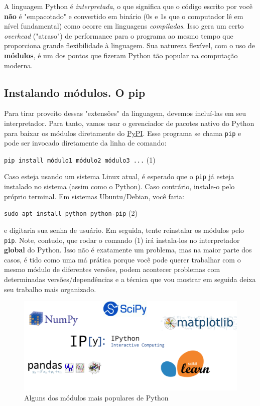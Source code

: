 \documentclass{article}
\begin{document}
	A linguagem Python é \textit{interpretada}, o que significa que o código escrito por você \textbf{não} é "empacotado" e
	convertido em binário (0s e 1s que o computador lê em nível fundamental) como ocorre em linguagens \textit{compiladas}. 
	Isso gera um certo \textit{overhead} ("atraso") de performance para o programa ao mesmo tempo que proporciona grande 
	flexibilidade à linguagem. Sua natureza flexível, com o uso de \textbf{módulos}, é um dos pontos que fizeram Python 
	tão popular na computação moderna. 

	\subsection{Instalando módulos. O pip}

	Para tirar proveito dessas "extensões" da linguagem, devemos incluí-las em seu interpretador. Para tanto, vamos usar
	o gerenciador de pacotes nativo do Python para baixar os módulos diretamente do \href{https://pypi.org/}{PyPI}.
	Esse programa se chama \texttt{pip} e pode ser invocado diretamente da linha de comando: 

	\vspace{1ex}
	\texttt{pip install módulo1 módulo2 módulo3 ...} (1)
	\vspace{1ex} 

	Caso esteja usando um sistema Linux atual, é esperado que o \texttt{pip} já esteja instalado no sistema (assim como o Python). 
	Caso contrário, instale-o pelo próprio terminal. Em sistemas Ubuntu/Debian, você faria: 

	\vspace{1ex} 
	\texttt{sudo apt install python python-pip} (2)
	\vspace{1ex} 

	e digitaria sua senha de usuário. Em seguida, tente reinstalar os módulos pelo \texttt{pip}. Note, contudo, que rodar o comando 
	(1) irá instala-los no interpretador \textbf{global} do Python. Isso não é exatamente um problema, mas na maior 
	parte dos casos, é tido como uma má prática porque você pode querer trabalhar com o mesmo módulo de diferentes versões,
	podem acontecer problemas com determinadas versões/dependências e a técnica que vou mostrar em seguida deixa seu trabalho
	mais organizado. 

	\begin{figure}[ht!]
  		\centering
		\includegraphics[scale=0.2]{figs/modules.png} 
  		\caption*{Alguns dos módulos mais populares de Python}
	\end{figure}
\end{document}
